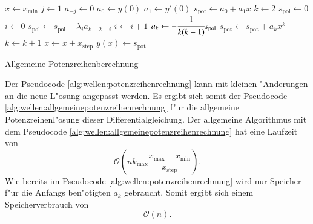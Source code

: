 \begin{algorithm}
	\begin{algorithmic}[1]
		\State $x \gets x_{\text{min}}$
			\State $j \gets 1$
				\State $a_{-j} \gets 0$
			\EndFor
			\State $a_0 \gets y(0)$
			\State $a_1 \gets y'(0)$
			\State $s_{\text{pot}} \gets a_0 + a_1x$
			\State $k \gets 2$
				\State $s_{\text{pol}} \gets 0$
				\State $i \gets 0$
					\State $s_{\text{pol}} \gets s_{\text{pol}}+\lambda_i 
					a_{k-2-i}$
					\State $i \gets i + 1$
				\EndFor
				\State $a_k \gets -\cfrac{1}{k(k-1)} s_{\text{pol}}$
				\State $s_{\text{pot}} \gets s_{\text{pot}} + a_k x^k$
				\State $k \gets k + 1$
			\EndFor
		\State $x \gets x + x_{\text{step}}$
		\State $y(x) \gets s_{\text{pot}}$
		\EndFor
	\end{algorithmic}
	
	\caption{Allgemeine Potenzreihenberechnung} 
	\label{alg:wellen:allgemeinepotenzreihenrechnung}
\end{algorithm}

Der Pseudocode \ref{alg:wellen:potenzreihenrechnung} kann mit kleinen 
"Anderungen an die neue L"osung angepasst werden. Es ergibt sich somit der 
Pseudocode \ref{alg:wellen:allgemeinepotenzreihenrechnung} f"ur die allgemeine 
Potenzreihenl"osung dieser Differentialgleichung. Der allgemeine Algorithmus 
mit dem Pseudocode \ref{alg:wellen:allgemeinepotenzreihenrechnung} hat eine 
Laufzeit von
\begin{equation*}
	\mathcal{O}
	\left(
		nk_{\text{max}}\frac{x_{\text{max}}-x_{\text{min}}}{x_{\text{step}}}
	\right).
\end{equation*}
Wie bereits im Pseudocode \ref{alg:wellen:potenzreihenrechnung} wird nur 
Speicher f"ur die Anfangs ben"otigten $a_k$ gebraucht. Somit ergibt sich einem 
Speicherverbrauch von
\begin{equation*}
	\mathcal{O}
	\left(
		n
	\right).
\end{equation*}